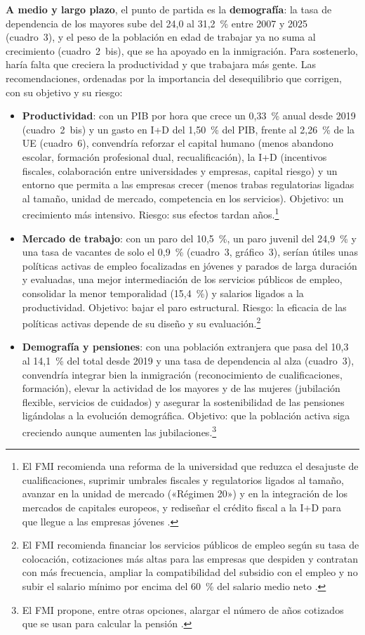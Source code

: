 \begin{examen}
\textbf{A medio y largo plazo}, el punto de partida es la \textbf{demografía}: la tasa de dependencia de los mayores sube del 24,0 al 31,2~\% entre 2007 y 2025 (cuadro~3), y el peso de la población en edad de trabajar ya no suma al crecimiento (cuadro~2~bis), que se ha apoyado en la inmigración. Para sostenerlo, haría falta que creciera la productividad y que trabajara más gente. Las recomendaciones, ordenadas por la importancia del desequilibrio que corrigen, con su objetivo y su riesgo:
\begin{itemize}
\item \textbf{Productividad}: con un PIB por hora que crece un 0,33~\% anual desde 2019 (cuadro~2~bis) y un gasto en I+D del 1,50~\% del PIB, frente al 2,26~\% de la UE (cuadro~6), convendría reforzar el capital humano (menos abandono escolar, formación profesional dual, recualificación), la I+D (incentivos fiscales, colaboración entre universidades y empresas, capital riesgo) y un entorno que permita a las empresas crecer (menos trabas regulatorias ligadas al tamaño, unidad de mercado, competencia en los servicios). Objetivo: un crecimiento más intensivo. Riesgo: sus efectos tardan años.\footnote{El FMI recomienda una reforma de la universidad que reduzca el desajuste de cualificaciones, suprimir umbrales fiscales y regulatorios ligados al tamaño, avanzar en la unidad de mercado («Régimen 20») y en la integración de los mercados de capitales europeos, y rediseñar el crédito fiscal a la I+D para que llegue a las empresas jóvenes .}
\item \textbf{Mercado de trabajo}: con un paro del 10,5~\%, un paro juvenil del 24,9~\% y una tasa de vacantes de solo el 0,9~\% (cuadro~3, gráfico~3), serían útiles unas políticas activas de empleo focalizadas en jóvenes y parados de larga duración y evaluadas, una mejor intermediación de los servicios públicos de empleo, consolidar la menor temporalidad (15,4~\%) y salarios ligados a la productividad. Objetivo: bajar el paro estructural. Riesgo: la eficacia de las políticas activas depende de su diseño y su evaluación.\footnote{El FMI recomienda financiar los servicios públicos de empleo según su tasa de colocación, cotizaciones más altas para las empresas que despiden y contratan con más frecuencia, ampliar la compatibilidad del subsidio con el empleo y no subir el salario mínimo por encima del 60~\% del salario medio neto .}
\item \textbf{Demografía y pensiones}: con una población extranjera que pasa del 10,3 al 14,1~\% del total desde 2019 y una tasa de dependencia al alza (cuadro~3), convendría integrar bien la inmigración (reconocimiento de cualificaciones, formación), elevar la actividad de los mayores y de las mujeres (jubilación flexible, servicios de cuidados) y asegurar la sostenibilidad de las pensiones ligándolas a la evolución demográfica. Objetivo: que la población activa siga creciendo aunque aumenten las jubilaciones.\footnote{El FMI propone, entre otras opciones, alargar el número de años cotizados que se usan para calcular la pensión .}

\end{itemize}
\end{examen}
